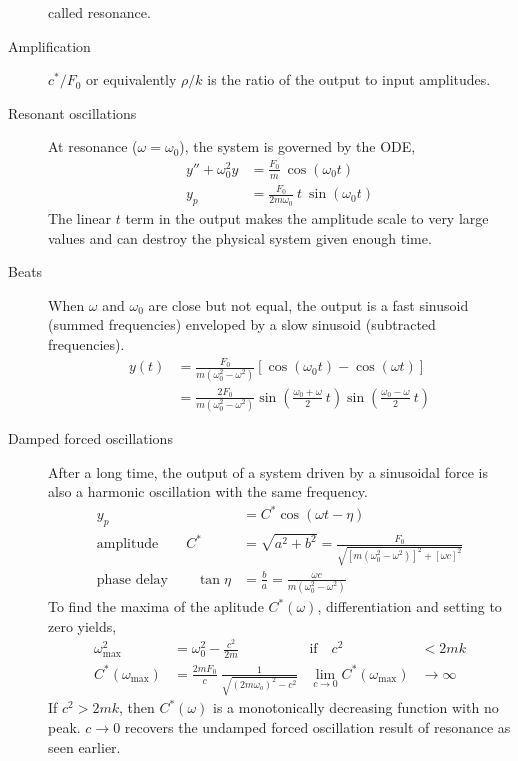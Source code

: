 \begin{description}
        called resonance. \par
    \item[Amplification] $ c^{*}/F_{0} $ or equivalently $ \rho / k $ is the ratio of the output
        to input amplitudes.
    \item[Resonant oscillations] At resonance ($ \omega = \omega_{0} $), the system
        is governed by the ODE,
        \begin{align}
            y'' + \omega_{0}^{2}y & = \frac{F_{0}}{m}\ \cos(\omega_{0} t)               \\
            y_{p}                 & = \frac{F_{0}}{2m\omega_{0}}\ t\ \sin(\omega_{0} t)
        \end{align}
        The linear $ t $ term in the output makes the amplitude scale to very large values
        and can destroy the physical system given enough time.
    \item[Beats] When $ \omega $ and $ \omega_{0} $ are close but not equal, the output is a
        fast sinusoid (summed frequencies) enveloped by a slow sinusoid (subtracted frequencies).
        \begin{align}
            y(t) & = \frac{F_{0}}{m(\omega_{0}^{2} - \omega^{2})} [\cos(\omega_{0}t) - \cos(\omega t)] \\
                 & = \frac{2F_{0}}{m(\omega_{0}^{2} - \omega^{2})}
            \sin\left( \frac{\omega_{0} + \omega}{2}\ t \right)
            \sin\left( \frac{\omega_{0} - \omega}{2}\ t \right)
        \end{align}
    \item[Damped forced oscillations] After a long time, the output of a system driven by a
        sinusoidal force is also a harmonic oscillation with the same frequency.
        \begin{align}
            y_{p}                              & = C^{*}\cos(\omega t - \eta)                                                                        \\
            \text{amplitude}\qquad C^{*}       & = \sqrt{a^{2} + b^{2}} = \frac{F_{0}}{\sqrt{[m(\omega_{0}^{2} - \omega^{2})]^{2} + [\omega c]^{2}}} \\
            \text{phase delay}\qquad \tan \eta & = \frac{b}{a} = \frac{\omega c}{m(\omega_{0}^{2} - \omega^{2})}
        \end{align}
        To find the maxima of the aplitude $ C^{*}(\omega) $, differentiation and setting to zero
        yields,
        \begin{align}
            \omega_{\text{max}}^{2}    & = \omega_{0}^{2} - \frac{c^{2}}{2m}                              & \text{if} \quad c^{2} & < 2mk \\
            C^{*}(\omega_{\text{max}}) & = \frac{2mF_{0}}{c}\ \frac{1}{\sqrt{(2m\omega_{o})^{2} - c^{2}}}
                                       & \lim_{c \rightarrow 0} C^{*}(\omega_{\text{max}})                & \rightarrow \infty
        \end{align}
        If $ c^{2} > 2mk $, then $ C^{*}(\omega) $ is a monotonically decreasing function with no
        peak. $ c \rightarrow 0 $ recovers the undamped forced oscillation result of resonance as
        seen earlier.
\end{description}
